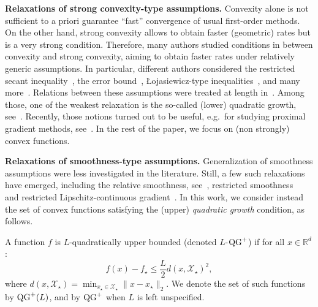     \textbf{Relaxations of strong convexity-type assumptions.}
    Convexity alone is not sufficient to a priori guarantee ``fast'' convergence of usual first-order methods.
    On the other hand, strong convexity allows to obtain faster (geometric) rates but is a very strong condition.
    Therefore, many authors studied conditions in between convexity and strong convexity, aiming to obtain faster rates under relatively generic assumptions.
    In particular, different authors considered the restricted secant inequality~\citep{zhang2013gradient, guille2022gradient},
    the error bound~\citep{luo_error_1993}, {\L}ojasiewicz-type inequalities~\citep{polyak_gradient_1963}, and many more~\citep{NIPS2015_5718,kurdyka1998gradients,liu2014asynchronous,gong2014linear,necoara2016linear,hardt2016gradient,abbaszadehpeivasti2022conditions}.
    Relations between these assumptions were treated at length in~\citep{bolte2017error,zhang2017restricted}.
    Among those, one of the weakest relaxation is the so-called (lower) quadratic growth, see~\citep{bonnans1993second, ioffe1994sensitivity,anitescu2000degenerate}.
    Recently, those notions turned out to be useful, e.g.~for studying proximal gradient methods, see~\citep{cui2017quadratic, drusvyatskiy2016error, drusvyatskiy2015quadratic, zhang2020, zhang2017linear,chieu2021quadratic}.
    In the rest of the paper, we focus on (non strongly) convex functions.

    \textbf{Relaxations of smoothness-type assumptions.} Generalization of smoothness assumptions were less investigated in the literature.
    Still, a few such relaxations have emerged, including the {relative smoothness}, see~\citep{bauschke2017descent,lu2016relativelysmooth,dragomir2021optimal, hanzely2018accelerated}, restricted smoothness~\citep{agarwal2011fast} and restricted Lipschitz-continuous gradient~\citep{zhang2013gradient}.
    In this work, we consider instead the set of convex functions satisfying the (upper) \textit{quadratic growth} condition, as follows.

    \begin{Def}
        A function $f$ is $L$-quadratically upper bounded (denoted $L$-$\operatorname{QG}^+$) if for all $x \in \mathbb{R}^d$: \[f(x)-f_\star \leq \frac{L}{2} d(x, \mathcal{X}_\star)^2,\]
        where $d(x, \mathcal{X}_\star) = \min_{x_\star \in \mathcal{X}_\star} \|x-x_\star\|_2$.
        We denote the set of such functions by $\operatorname{QG}^+(L)$, and by $\operatorname{QG}^+$ when $L$ is left unspecified.
    \end{Def}

